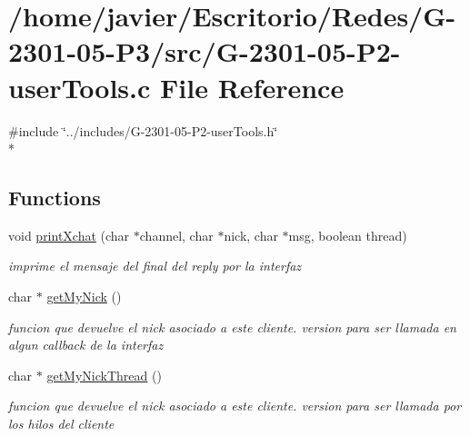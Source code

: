 \hypertarget{_g-2301-05-_p2-user_tools_8c}{\section{/home/javier/\-Escritorio/\-Redes/\-G-\/2301-\/05-\/\-P3/src/\-G-\/2301-\/05-\/\-P2-\/user\-Tools.c File Reference}
\label{_g-2301-05-_p2-user_tools_8c}
}
{\ttfamily \#include \char`\"{}../includes/\-G-\/2301-\/05-\/\-P2-\/user\-Tools.\-h\char`\"{}}\\*
\subsection*{Functions}
\begin{DoxyCompactItemize}
\item 
void \hyperlink{_g-2301-05-_p2-user_tools_8c_a3e267cdf9839a331d371dd5f980d153e}{print\-Xchat} (char $\ast$channel, char $\ast$nick, char $\ast$msg, boolean thread)
\begin{DoxyCompactList}\small\item\em imprime el mensaje del final del reply por la interfaz \end{DoxyCompactList}\item 
char $\ast$ \hyperlink{_g-2301-05-_p2-user_tools_8c_afc2d4ce661d2f13fbe4b5518d778d071}{get\-My\-Nick} ()
\begin{DoxyCompactList}\small\item\em funcion que devuelve el nick asociado a este cliente. version para ser llamada en algun callback de la interfaz \end{DoxyCompactList}\item 
char $\ast$ \hyperlink{_g-2301-05-_p2-user_tools_8c_ab409491dfa3ca1ed9713df0eabdb70ed}{get\-My\-Nick\-Thread} ()
\begin{DoxyCompactList}\small\item\em funcion que devuelve el nick asociado a este cliente. version para ser llamada por los hilos del cliente \end{DoxyCompactList}\end{DoxyCompactItemize}



